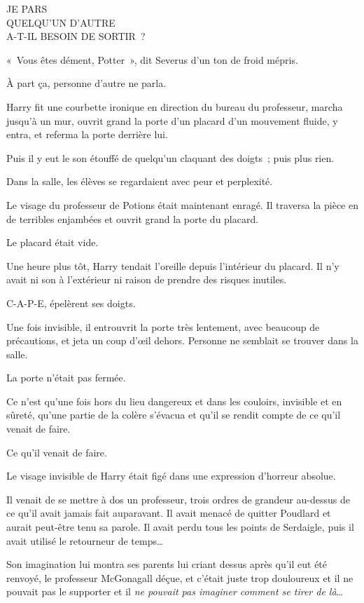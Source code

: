 \begin{writtenNote}
JE PARS\\
QUELQU'UN D'AUTRE\\
A-T-IL BESOIN DE SORTIR~?
\end{writtenNote}

«~Vous êtes dément, Potter~», dit Severus d'un ton de froid mépris.

À part ça, personne d'autre ne parla.

Harry fit une courbette ironique en direction du bureau du professeur, marcha jusqu'à un mur, ouvrit grand la porte d'un placard d'un mouvement fluide, y entra, et referma la porte derrière lui.

Puis il y eut le son étouffé de quelqu'un claquant des doigts~; puis plus rien.

Dans la salle, les élèves se regardaient avec peur et perplexité.

Le visage du professeur de Potions était maintenant enragé.
Il traversa la pièce en de terribles enjambées et ouvrit grand la porte du placard.

Le placard était vide.

\later

Une heure plus tôt, Harry tendait l'oreille depuis l'intérieur du placard.
Il n'y avait ni son à l'extérieur ni raison de prendre des risques inutiles.

C-A-P-E, épelèrent ses doigts.

Une fois invisible, il entrouvrit la porte très lentement, avec beaucoup de précautions, et jeta un coup d'œil dehors.
Personne ne semblait se trouver dans la salle.

La porte n'était pas fermée.

Ce n'est qu'une fois hors du lieu dangereux et dans les couloirs, invisible et en sûreté, qu'une partie de la colère s'évacua et qu'il se rendit compte de ce qu'il venait de faire.

Ce qu'il venait de faire.

Le visage invisible de Harry était figé dans une expression d'horreur absolue.

Il venait de se mettre à dos un professeur, trois ordres de grandeur au-dessus de ce qu'il avait jamais fait auparavant.
Il avait menacé de quitter Poudlard et aurait peut-être tenu sa parole.
Il avait perdu tous les points de Serdaigle, puis il avait utilisé le retourneur de temps…

Son imagination lui montra ses parents lui criant dessus après qu'il eut été renvoyé, le professeur McGonagall déçue, et c'était juste trop douloureux et il ne pouvait pas le supporter et il \emph{ne pouvait pas imaginer comment se tirer de là}…


